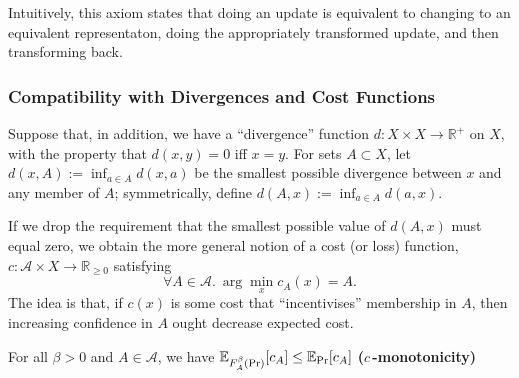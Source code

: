 \documentclass{article}
\begin{document}
Intuitively, this axiom states that doing an update is equivalent to changing to an equivalent representaton, doing the appropriately transformed update, and then transforming back.



\begin{wip}
\subsubsection*{Compatibility with Divergences and Cost Functions}
Suppose that, in addition, we have a ``divergence'' function $d : X \times X \to \mathbb R^+$ on $X$, with the property that $d(x,y) = 0$ iff $x = y$.
For sets $A \subset X$, let $d(x, A) := \inf_{a \in A} d(x,a)$ be the smallest possible divergence between $x$ and any member of $A$; symmetrically, define $d(A, x) := \inf_{a \in A} d(a,x)$.

If we drop the requirement that the smallest possible value of $d(A,x)$ must equal zero, we obtain the more general notion of a cost (or loss) function, $c :\mathcal A \times X \to \mathbb R_{\ge 0}$ satisfying
\[
\forall A \in \mathcal A.~\arg\min_{x} c_A(x) = A.
\]
The idea is that, if $c(x)$ is some cost that ``incentivises'' membership in $A$, then increasing confidence in $A$ ought decrease expected cost.
\begin{CFaxioms}
    \item For all $\beta > 0$ and $A\in\mathcal A$, we have
    $\operatorname*{\mathbb{E}}_{F^{\beta}_A(\Pr)} [ c_A ]
        \le
        \operatorname*{\mathbb{E}}_{\Pr}[ c_A ]
    $
        \hfill \textbf{($c$\,-monotonicity)}
\end{CFaxioms}



\end{wip}
\end{document}
